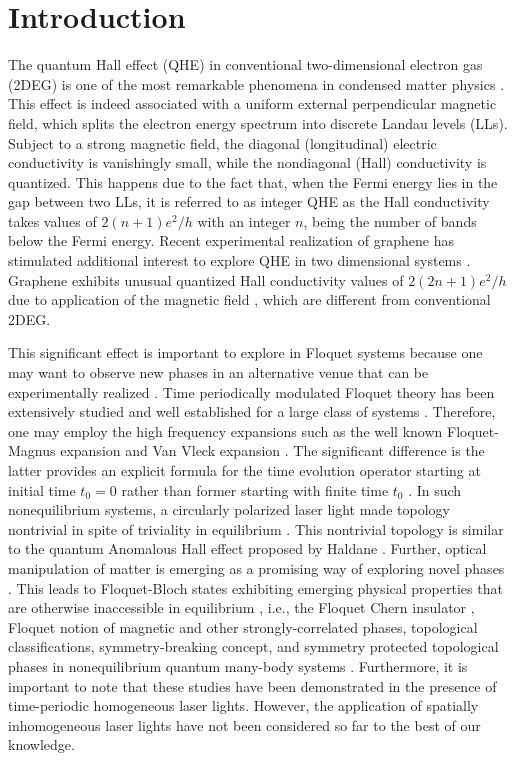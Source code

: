 \section{Introduction}

The quantum Hall effect (QHE) in conventional two-dimensional electron gas (2DEG) is one of the most remarkable phenomena in condensed matter physics \cite{QHE1}.
This effect is indeed associated with a uniform external perpendicular magnetic field, which splits the electron energy spectrum into discrete Landau levels (LLs).
Subject to a strong magnetic field, the diagonal (longitudinal) electric conductivity is vanishingly small, while the nondiagonal (Hall) conductivity is quantized.
This happens due to the fact that, when the Fermi energy lies in the gap between two LLs, it is referred to as integer QHE as the Hall conductivity takes values of $2(n + 1)e^2/h$ with an integer $n$, being the number of bands below the Fermi energy.
Recent experimental realization of graphene has stimulated additional interest to explore QHE in two dimensional systems \cite{QHE2, QHE3, QHE4}.
Graphene exhibits unusual quantized Hall conductivity values of $2(2n + 1)e^2/h$ due to application of the magnetic field \cite{QHE4}, which are different from conventional 2DEG.

This significant effect is important to explore in Floquet systems \cite{NHL, AEE} because one may want to observe new phases in an alternative venue that can be experimentally realized \cite{MCR, YHW, HZJ, JWM}.
Time periodically modulated Floquet theory has been extensively studied and well established for a large class of systems \cite{JHS,HSA,MGP,MBL,AEE,NGJ}.
Therefore, one may employ the high frequency expansions \cite{MBL,AEE,NGJ,SRI,API,TMS,ESM,TKT,ALA} such as the well known Floquet-Magnus expansion \cite{ESM,TKT,ALA,FCA} and Van Vleck expansion \cite{MBL,AEE}.
The significant difference is the latter provides an explicit formula for the time evolution operator starting at initial time $t_{0}=0$ rather than former starting with finite time $t_{0}$ \cite{supp}.
In such nonequilibrium systems, a circularly polarized laser light made topology nontrivial in spite of triviality in equilibrium \cite{TKO}.
This nontrivial topology is similar to the quantum Anomalous Hall effect proposed by Haldane \cite{Haldane}.
Further, optical manipulation of matter is emerging as a promising way of exploring novel phases \cite{AKA, JHM}.
This leads to Floquet-Bloch states exhibiting emerging physical properties that are otherwise inaccessible in equilibrium \cite{LST}, i.e., the Floquet Chern insulator \cite{AGG}, Floquet notion of magnetic and other strongly-correlated phases\cite{MSR}, topological classifications, symmetry-breaking concept, and symmetry protected topological phases in nonequilibrium quantum many-body systems \cite{EKM, MSR}.
Furthermore, it is important to note that these studies have been demonstrated in the presence of time-periodic homogeneous laser lights.
However, the application of spatially inhomogeneous \cite{SWP1, SWP2, SWP3, SWP4, SWP5} laser lights have not been considered so far to the best of our knowledge.

